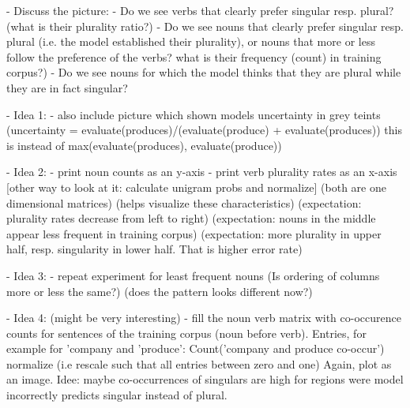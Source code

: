 \begin{multicols}{2}
- Discuss the picture:
  - Do we see verbs that clearly prefer singular resp. plural?
      (what is their plurality ratio?)
  - Do we see nouns that clearly prefer singular resp. plural
      (i.e. the model established their plurality), 
    or nouns that more or less follow the preference of the verbs?
     what is their frequency (count) in training corpus?)
  - Do we see nouns for which the model thinks
    that they are plural while they are in fact singular?
    
- Idea 1:
  - also include picture which shown models uncertainty in grey teints
    (uncertainty = evaluate(produces)/(evaluate(produce) + evaluate(produces))
    this is instead of max(evaluate(produces), evaluate(produce))

- Idea 2:
  - print noun counts as an y-axis
  - print verb plurality rates as an x-axis
  [other way to look at it: calculate unigram probs and normalize]
  (both are one dimensional matrices)
  (helps visualize these characteristics)
  (expectation: plurality rates decrease from left to right)
  (expectation: nouns in the middle appear less frequent in training corpus)
  (expectation: more plurality in upper half, resp. singularity in lower half. That is higher error rate)

- Idea 3:
  - repeat experiment for least frequent nouns
  (Is ordering of columns more or less the same?)
  (does the pattern looks different now?)
  
- Idea 4:
(might be very interesting)
- fill the noun verb matrix with co-occurence counts for
sentences of the training corpus (noun before verb).
Entries, for example for 'company and 'produce':
Count('company and produce co-occur')
normalize (i.e rescale such that all entries between zero and one)
Again, plot as an image.
Idee: maybe co-occurrences of singulars are high for regions
were model incorrectly predicts singular instead of plural.
  







\end{multicols}
